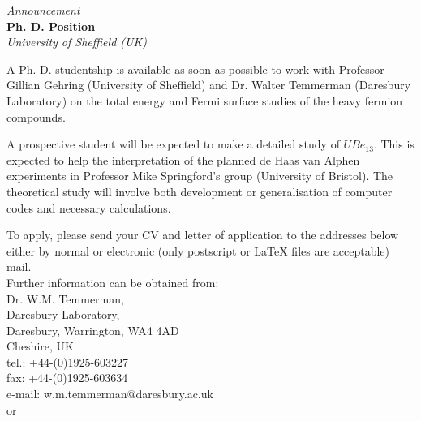 {%
\newpage
\null
\vspace{0.5cm}
\begin{center}
\LARGE{\it  Announcement }\\[1.0cm]
\LARGE{\bf Ph. D. Position}\\[0.3cm]
{\Large {\it University of Sheffield (UK)}}\\
\end{center}
 
\ni A Ph. D. studentship is available as soon as possible to work with Professor
Gillian Gehring (University of Sheffield) and Dr. Walter Temmerman (Daresbury
Laboratory) on the total energy and Fermi surface studies of the heavy fermion compounds.
 
\ni A prospective student will be expected to make a detailed study of $UBe_{13}$. This
is expected to help the interpretation of the planned de Haas van Alphen experiments
in Professor Mike Springford's group (University of Bristol). The theoretical study
will involve both development or generalisation of computer codes and necessary calculations.
 
\ni To apply, please send your CV and letter of application to the addresses below either
by normal or electronic (only postscript or LaTeX files are acceptable) mail.\\
\ni Further information can be obtained from:\\
 
Dr. W.M. Temmerman,\\
Daresbury Laboratory,\\
Daresbury, Warrington, WA4 4AD\\
Cheshire, UK\\
tel.: +44-(0)1925-603227 \\
fax:  +44-(0)1925-603634 \\
e-mail: w.m.temmerman@daresbury.ac.uk \\
 
or\\
 
}
